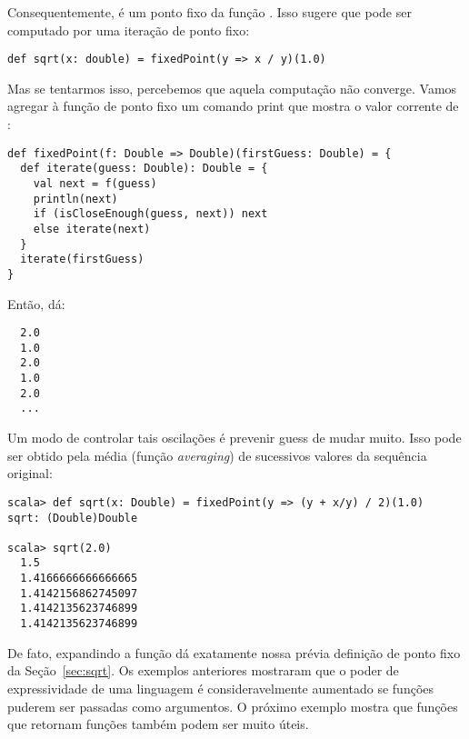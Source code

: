 Consequentemente,  \'{e} um ponto fixo da fun\c{c}\~{a}o .
Isso sugere que  pode ser computado por uma itera\c{c}\~{a}o de ponto fixo: 
\begin{lstlisting}
def sqrt(x: double) = fixedPoint(y => x / y)(1.0)
\end{lstlisting}
Mas se tentarmos isso, percebemos que aquela computa\c{c}\~{a}o n\~{a}o converge. 
Vamos agregar à fun\c{c}\~{a}o de ponto fixo um comando print que mostra o 
valor corrente de : 
\begin{lstlisting}
def fixedPoint(f: Double => Double)(firstGuess: Double) = {
  def iterate(guess: Double): Double = {
    val next = f(guess)
    println(next)
    if (isCloseEnough(guess, next)) next
    else iterate(next)
  }
  iterate(firstGuess)
}
\end{lstlisting}
Ent\~{a}o,  d\'{a}: 
\begin{lstlisting}
  2.0
  1.0
  2.0
  1.0
  2.0
  ...
\end{lstlisting}

Um modo de controlar tais oscila\c{c}\~{o}es \'{e} prevenir guess de mudar muito.
Isso pode ser obtido pela m\'{e}dia (fun\c{c}\~{a}o {\em averaging}) de sucessivos valores da sequ\^{e}ncia 
original:
\begin{lstlisting}
scala> def sqrt(x: Double) = fixedPoint(y => (y + x/y) / 2)(1.0)
sqrt: (Double)Double

scala> sqrt(2.0)
  1.5
  1.4166666666666665
  1.4142156862745097
  1.4142135623746899
  1.4142135623746899
\end{lstlisting}
De fato, expandindo a fun\c{c}\~{a}o  d\'{a} exatamente nossa pr\'{e}via
defini\c{c}\~{a}o de ponto fixo da Se\c{c}\~{a}o~\ref{sec:sqrt}.
Os exemplos anteriores mostraram que o poder de expressividade de uma linguagem 
\'{e} consideravelmente aumentado se fun\c{c}\~{o}es puderem ser passadas como argumentos.
O pr\'{o}ximo exemplo mostra que fun\c{c}\~{o}es que retornam fun\c{c}\~{o}es tamb\'{e}m podem ser
muito \'{u}teis.


